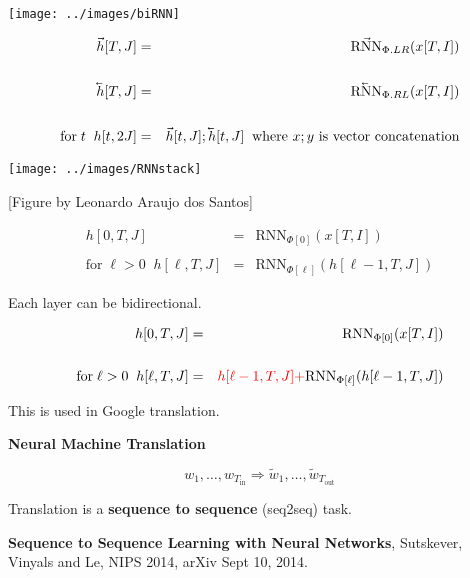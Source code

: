 {\centerline{\texttt{[image: ../images/biRNN]}}

\begin{eqnarray*}
\vec{h}[T,J] & = & \vec{\mathrm{RNN}}_{\Phi.LR}(x[T,I]) \\
\\
\cev{h}[T,J] & = & \cev{\mathrm{RNN}}_{\Phi.RL}(x[T,I]) \\
\\
\mbox{for}\;t\;\;h[t,2J] & = & \vec{h}[t,J];\cev{h}[t,J]\;\;\mbox{where $x;y$ is vector concatenation}
\end{eqnarray*}


\centerline{\texttt{[image: ../images/RNNstack]}}
\centerline{\large [Figure by Leonardo Araujo dos Santos]}

\begin{eqnarray*}
h[0,T,J] & = & \mathrm{RNN}_{\Phi[0]}(x[T,I]) \\
\\
\mbox{for} \;\ell > 0\;\;h[\ell,T,J] & = & \mathrm{RNN}_{\Phi[\ell]}(h[\ell-1,T,J])
\end{eqnarray*}

Each layer can be bidirectional.



\begin{eqnarray*}
h[0,T,J] & = & \mathrm{RNN}_{\Phi[0]}(x[T,I]) \\
\\
\mbox{for} \;\ell > 0\;\;h[\ell,T,J] & = & {\color{red} h[\ell-1,T,J] +} \mathrm{RNN}_{\Phi[\ell]}(h[\ell-1,T,J])
\end{eqnarray*}

\vfill
This is used in Google translation.

\slide{}

\centerline{\bf Neural Machine Translation}



$$w_1,\ldots,w_{T_{\mathrm{in}}} \Rightarrow \tilde{w}_1,\ldots,\tilde{w}_{T_{\mathrm{out}}}$$

\vfill
Translation is a {\bf sequence to sequence} (seq2seq) task.

\vfill
{\bf Sequence to Sequence Learning with Neural Networks}, Sutskever, Vinyals and Le, NIPS 2014, arXiv Sept 10, 2014.

}

